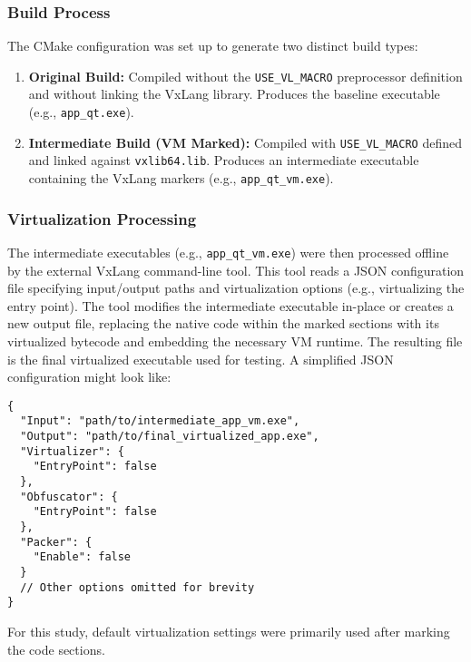 \subsubsection{Build Process} The CMake configuration was set up to generate two distinct build types:
\begin{enumerate}
    \item \textbf{Original Build:} Compiled without the \texttt{USE\_VL\_MACRO} preprocessor definition and without linking the VxLang library. Produces the baseline executable (e.g., \texttt{app\_qt.exe}).
    \item \textbf{Intermediate Build (VM Marked):} Compiled with \texttt{USE\_VL\_MACRO} defined and linked against \texttt{vxlib64.lib}. Produces an intermediate executable containing the VxLang markers (e.g., \texttt{app\_qt\_vm.exe}).
\end{enumerate}

\subsubsection{Virtualization Processing} The intermediate executables (e.g., \texttt{app\_qt\_vm.exe}) were then processed offline by the external VxLang command-line tool. This tool reads a JSON configuration file specifying input/output paths and virtualization options (e.g., virtualizing the entry point). The tool modifies the intermediate executable in-place or creates a new output file, replacing the native code within the marked sections with its virtualized bytecode and embedding the necessary VM runtime. The resulting file is the final virtualized executable used for testing. A simplified JSON configuration might look like:

\begin{verbatim}
{
  "Input": "path/to/intermediate_app_vm.exe",
  "Output": "path/to/final_virtualized_app.exe",
  "Virtualizer": {
    "EntryPoint": false 
  },
  "Obfuscator": { 
    "EntryPoint": false 
  },
  "Packer": { 
    "Enable": false 
  } 
  // Other options omitted for brevity
}
\end{verbatim}
For this study, default virtualization settings were primarily used after marking the code sections.
